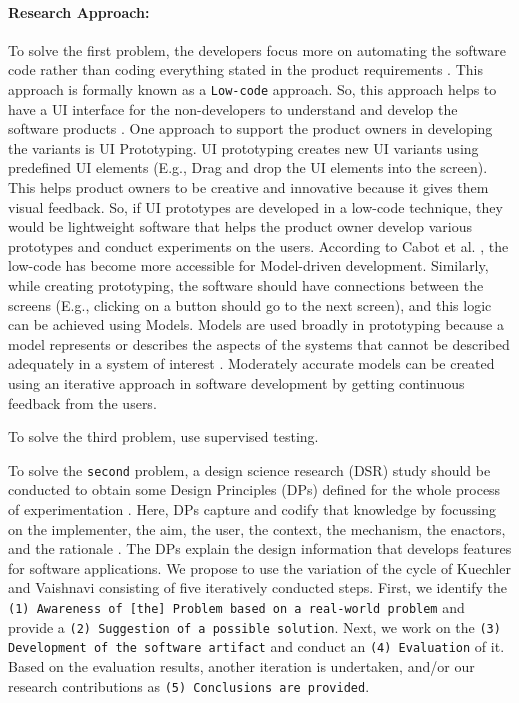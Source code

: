 \paragraph{Research Approach:} 
To solve the first problem, the developers focus more on automating the software code rather than coding everything stated in the product requirements \cite{article:prototyping:hoffnagle}.
This approach is formally known as a \texttt{Low-code} approach.
So, this approach helps to have a UI interface for the non-developers to understand and develop the software products \cite{paper:lowcode:khorram}.
One approach to support the product owners in developing the variants is UI Prototyping. 
UI prototyping creates new UI variants using predefined UI elements (E.g., Drag and drop the UI elements into the screen). 
This helps product owners to be creative and innovative because it gives them visual feedback.
So, if UI prototypes are developed in a low-code technique, they would be lightweight software that helps the product owner develop various prototypes and conduct experiments on the users.
According to Cabot et al. \cite{paper:lowcode:cabot}, the low-code has become more accessible for Model-driven development. 
Similarly, while creating prototyping, the software should have connections between the screens (E.g., clicking on a button should go to the next screen), and this logic can be achieved using Models.
Models are used broadly in prototyping because a model represents or describes the aspects of the systems that cannot be described adequately in a system of interest \cite{paper:prototyping:luqi}.
Moderately accurate models can be created using an iterative approach in software development by getting continuous feedback from the users.

To solve the third problem, use supervised testing.

To solve the \texttt{second} problem, a design science research (DSR) study should be conducted to obtain some Design Principles (DPs) defined for the whole process of experimentation \cite{paper:designprinciple:vk}. 
Here, DPs capture and codify that knowledge by focussing on the implementer, the aim, the user, the context, the mechanism, the enactors, and the rationale \cite{paper:designprinciple:gregor}. The DPs explain the design information that develops features for software applications.
We propose to use the variation of the cycle of Kuechler and Vaishnavi \cite{paper:designprinciple:vk} consisting of five iteratively conducted steps.  First, we identify
the \texttt{(1) Awareness of [the] Problem based on a real-world problem} and provide a
\texttt{(2) Suggestion of a possible solution}. Next, we work on the \texttt{(3) Development of
the software artifact} and conduct an \texttt{(4) Evaluation} of it. Based on the evaluation
results, another iteration is undertaken, and/or our research contributions as \texttt{(5)
Conclusions are provided}.

